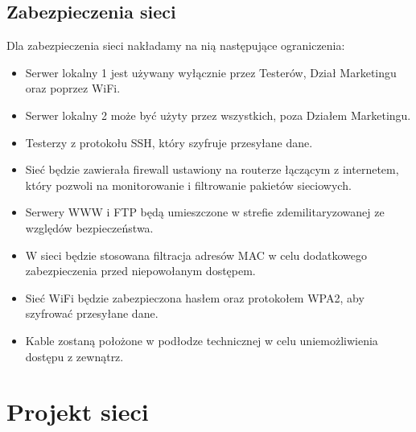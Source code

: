 \documentclass[a4paper,12pt]{extarticle}  %
\begin{document}
\subsection{Zabezpieczenia sieci}
Dla zabezpieczenia sieci nakładamy na nią następujące ograniczenia:
\begin{itemize}
    \item Serwer lokalny 1 jest używany wyłącznie przez Testerów, Dział Marketingu oraz poprzez WiFi.
    \item Serwer lokalny 2 może być użyty przez wszystkich, poza Działem Marketingu.
    \item Testerzy z protokołu SSH, który szyfruje przesyłane dane.
    \item Sieć będzie zawierała firewall ustawiony na routerze łączącym z internetem, który pozwoli na monitorowanie i filtrowanie pakietów sieciowych.
    \item Serwery WWW i FTP będą umieszczone w strefie zdemilitaryzowanej ze względów bezpieczeństwa.
    \item W sieci będzie stosowana filtracja adresów MAC w celu dodatkowego zabezpieczenia przed niepowołanym dostępem.
    \item Sieć WiFi będzie zabezpieczona hasłem oraz protokołem WPA2, aby szyfrować przesyłane dane.
    \item Kable zostaną położone w podłodze technicznej w celu uniemożliwienia dostępu z zewnątrz.
\end{itemize}

\section{Projekt sieci}
\end{document}
